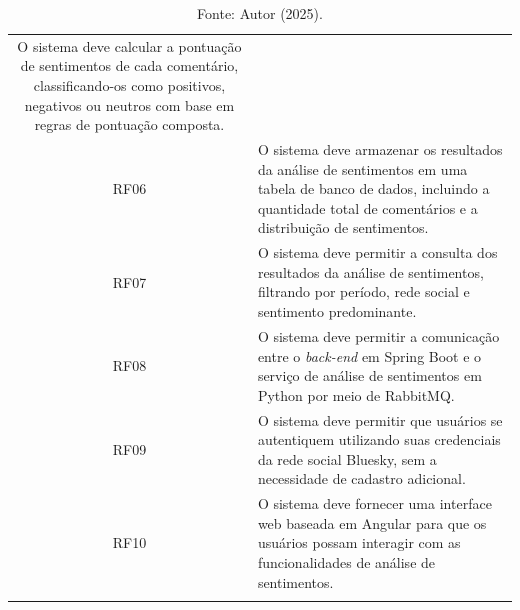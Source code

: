 \documentclass[
	12pt,				%
	oneside,			%
	a4paper,			%
	english,			%
	french,				%
	spanish,			%
	brazil				%
	]{abntex2}
\def\bottomrule{\hlineB{3}} %
\begin{document}
\begin{longtable}[]{|c|l|}
\begin{minipage}[t]{0.87\columnwidth}
O sistema deve calcular a pontuação de sentimentos de cada comentário, classificando-os como positivos, negativos ou neutros com base em regras de pontuação composta.\strut
\end{minipage}\tabularnewline
\begin{minipage}[t]{0.07\columnwidth}\centering
RF06\strut
\end{minipage} & \begin{minipage}[t]{0.87\columnwidth}\raggedright
O sistema deve armazenar os resultados da análise de sentimentos em uma tabela de banco de dados, incluindo a quantidade total de comentários e a distribuição de sentimentos.\strut
\end{minipage}\tabularnewline
\begin{minipage}[t]{0.07\columnwidth}\centering
RF07\strut
\end{minipage} & \begin{minipage}[t]{0.87\columnwidth}\raggedright
O sistema deve permitir a consulta dos resultados da análise de sentimentos, filtrando por período, rede social e sentimento predominante.\strut
\end{minipage}\tabularnewline
\begin{minipage}[t]{0.07\columnwidth}\centering
RF08\strut
\end{minipage} & \begin{minipage}[t]{0.87\columnwidth}\raggedright
O sistema deve permitir a comunicação entre o \emph{back-end} em Spring Boot e o serviço de análise de sentimentos em Python por meio de RabbitMQ.\strut
\end{minipage}\tabularnewline
\begin{minipage}[t]{0.07\columnwidth}\centering
RF09\strut
\end{minipage} & \begin{minipage}[t]{0.87\columnwidth}\raggedright
O sistema deve permitir que usuários se autentiquem utilizando suas credenciais da rede social Bluesky, sem a necessidade de cadastro adicional.\strut
\end{minipage}\tabularnewline
\begin{minipage}[t]{0.07\columnwidth}\centering
RF10\strut
\end{minipage} & \begin{minipage}[t]{0.87\columnwidth}\raggedright
O sistema deve fornecer uma interface web baseada em Angular para que os usuários possam interagir com as funcionalidades de análise de sentimentos.\strut
\end{minipage}\tabularnewline
\bottomrule
\caption*{Fonte: Autor (2025).}
\end{longtable}
\renewcommand\LTcaptype{table}
\end{document}
